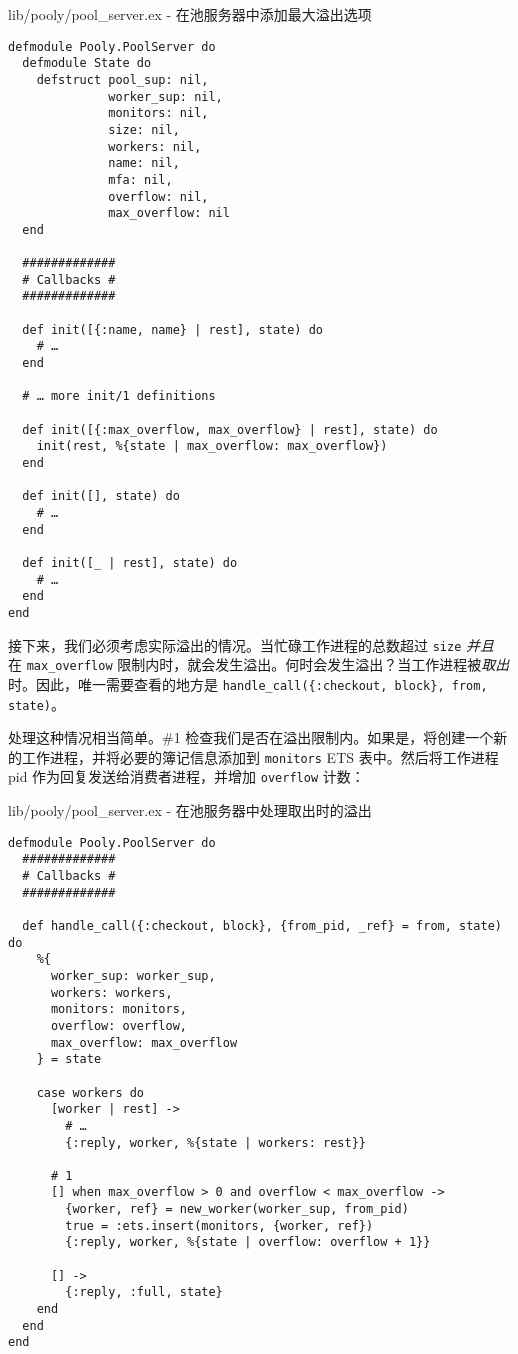\begin{code}{lib/pooly/pool\_server.ex - 在池服务器中添加最大溢出选项}

\begin{verbatim}
defmodule Pooly.PoolServer do
  defmodule State do
    defstruct pool_sup: nil,
              worker_sup: nil,
              monitors: nil,
              size: nil,
              workers: nil,
              name: nil,
              mfa: nil,
              overflow: nil,
              max_overflow: nil
  end

  #############
  # Callbacks #
  #############

  def init([{:name, name} | rest], state) do
    # …
  end

  # … more init/1 definitions

  def init([{:max_overflow, max_overflow} | rest], state) do
    init(rest, %{state | max_overflow: max_overflow})
  end

  def init([], state) do
    # …
  end

  def init([_ | rest], state) do
    # …
  end
end
\end{verbatim}
\end{code}

接下来，我们必须考虑实际溢出的情况。当忙碌工作进程的总数超过
\texttt{size} \emph{并且} 在
\texttt{max\_overflow}
限制内时，就会发生溢出。何时会发生溢出？当工作进程被\emph{取出}时。因此，唯一需要查看的地方是
\texttt{handle\_call(\{:checkout, block\}, from, state)}。

处理这种情况相当简单。\#1
检查我们是否在溢出限制内。如果是，将创建一个新的工作进程，并将必要的簿记信息添加到
\texttt{monitors} ETS 表中。然后将工作进程 pid
作为回复发送给消费者进程，并增加 \texttt{overflow}
计数：

\begin{code}{lib/pooly/pool\_server.ex - 在池服务器中处理取出时的溢出}

\begin{verbatim}
defmodule Pooly.PoolServer do
  #############
  # Callbacks #
  #############

  def handle_call({:checkout, block}, {from_pid, _ref} = from, state) do
    %{
      worker_sup: worker_sup,
      workers: workers,
      monitors: monitors,
      overflow: overflow,
      max_overflow: max_overflow
    } = state

    case workers do
      [worker | rest] ->
        # …
        {:reply, worker, %{state | workers: rest}}

      # 1
      [] when max_overflow > 0 and overflow < max_overflow ->
        {worker, ref} = new_worker(worker_sup, from_pid)
        true = :ets.insert(monitors, {worker, ref})
        {:reply, worker, %{state | overflow: overflow + 1}}

      [] ->
        {:reply, :full, state}
    end
  end
end
\end{verbatim}
\end{code}

